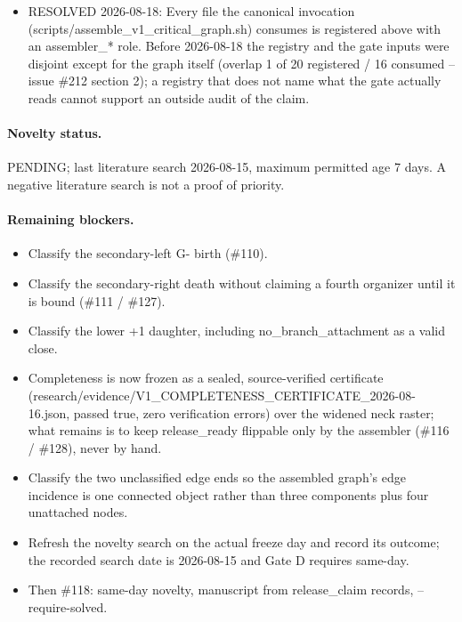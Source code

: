 \begin{itemize}
\item RESOLVED 2026-08-18: Every file the canonical invocation (scripts/assemble\_v1\_critical\_graph.sh) consumes is registered above with an assembler\_* role. Before 2026-08-18 the registry and the gate inputs were disjoint except for the graph itself (overlap 1 of 20 registered / 16 consumed -- issue \#212 section 2); a registry that does not name what the gate actually reads cannot support an outside audit of the claim.
\end{itemize}
\paragraph{Novelty status.}
PENDING; last literature search 2026-08-15, maximum permitted age 7 days. A negative literature search is not a proof of priority.
\paragraph{Remaining blockers.}
\begin{itemize}
\item Classify the secondary-left G- birth (\#110).
\item Classify the secondary-right death without claiming a fourth organizer until it is bound (\#111 / \#127).
\item Classify the lower +1 daughter, including no\_branch\_attachment as a valid close.
\item Completeness is now frozen as a sealed, source-verified certificate (research/evidence/V1\_COMPLETENESS\_CERTIFICATE\_2026-08-16.json, passed true, zero verification errors) over the widened neck raster; what remains is to keep release\_ready flippable only by the assembler (\#116 / \#128), never by hand.
\item Classify the two unclassified edge ends so the assembled graph's edge incidence is one connected object rather than three components plus four unattached nodes.
\item Refresh the novelty search on the actual freeze day and record its outcome; the recorded search date is 2026-08-15 and Gate D requires same-day.
\item Then \#118: same-day novelty, manuscript from release\_claim records, --require-solved.
\end{itemize}
